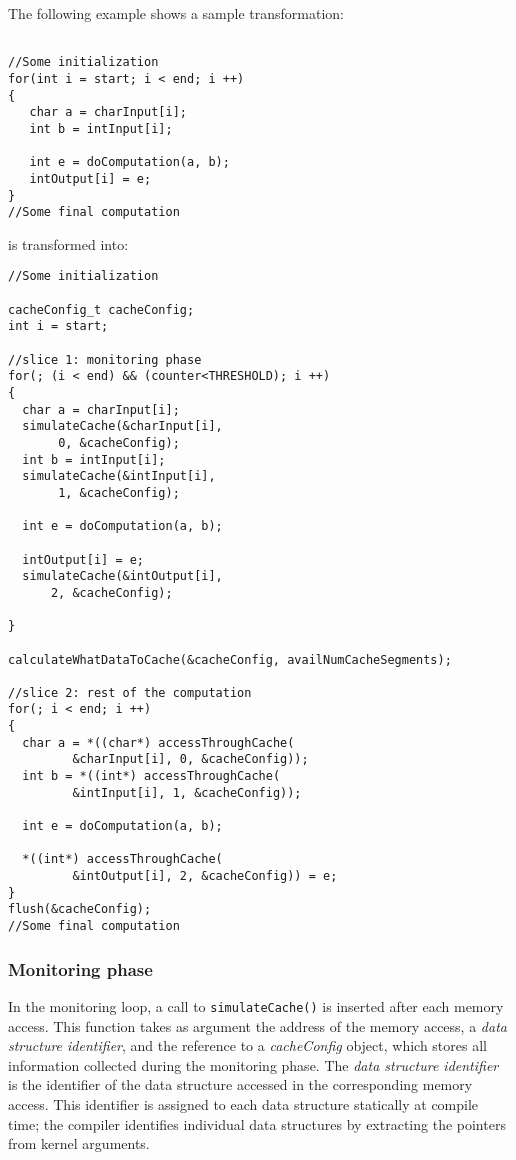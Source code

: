 The following example shows a sample transformation: 

{\footnotesize

\begin{verbatim}

//Some initialization
for(int i = start; i < end; i ++)
{
   char a = charInput[i];
   int b = intInput[i];
 
   int e = doComputation(a, b);
   intOutput[i] = e;
}
//Some final computation
\end{verbatim}
}
is transformed into:

{\footnotesize
\begin{verbatim}
//Some initialization

cacheConfig_t cacheConfig;
int i = start;

//slice 1: monitoring phase
for(; (i < end) && (counter<THRESHOLD); i ++)
{
  char a = charInput[i];
  simulateCache(&charInput[i], 
       0, &cacheConfig);
  int b = intInput[i];
  simulateCache(&intInput[i], 
       1, &cacheConfig);

  int e = doComputation(a, b);

  intOutput[i] = e;
  simulateCache(&intOutput[i], 
      2, &cacheConfig);

}

calculateWhatDataToCache(&cacheConfig, availNumCacheSegments);

//slice 2: rest of the computation
for(; i < end; i ++)
{
  char a = *((char*) accessThroughCache(
         &charInput[i], 0, &cacheConfig));
  int b = *((int*) accessThroughCache(
         &intInput[i], 1, &cacheConfig));

  int e = doComputation(a, b);

  *((int*) accessThroughCache(
         &intOutput[i], 2, &cacheConfig)) = e;
}
flush(&cacheConfig);
//Some final computation
\end{verbatim}
}

\subsubsection{Monitoring phase}
In the monitoring loop, a call to \texttt{simulateCache()} is inserted after each memory access.
This function takes as argument the address of the memory access, a {\it data structure identifier}, and the reference to a {\it cacheConfig} object, which stores all information collected during the monitoring phase.
The {\it data structure identifier} is the identifier of the data structure accessed in the corresponding memory access. 
This identifier is assigned to each data structure statically at compile time; the compiler identifies individual data structures by extracting the pointers from kernel arguments. 

